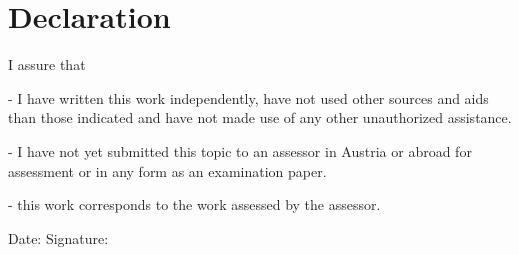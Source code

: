 \chapter*{Declaration}
\label{ch:declaration}

\begin{flushleft}
I assure that 
\end{flushleft}

\begin{flushleft}
- I have written this work independently, have not used other sources and aids than those indicated and have not made use of any other unauthorized assistance.
\end{flushleft}

\begin{flushleft}
- I have not yet submitted this topic to an assessor in Austria or abroad for assessment or in any form as an examination paper.
\end{flushleft}

\begin{flushleft}
- this work corresponds to the work assessed by the assessor.
\end{flushleft}

\vspace{1.5cm}

Date:	\hrulefill\enspace Signature: \hrulefill
\\[3.5cm]